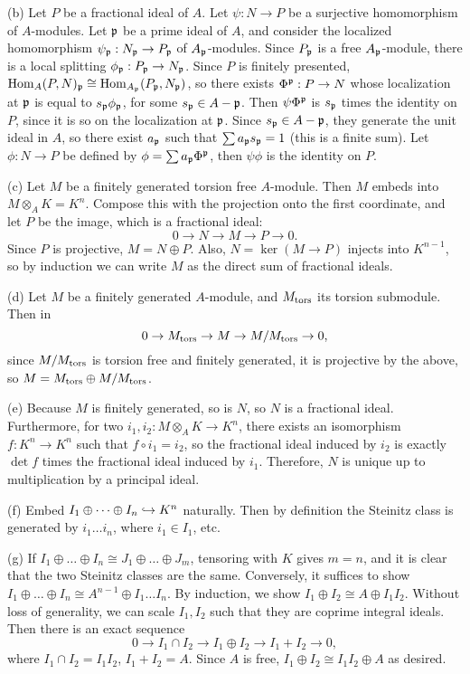 \documentclass[11pt]{amsart}
\begin{document}
(b) Let $P$ be a fractional ideal of $A$. Let $\psi: N\to P$ be a surjective homomorphism of $A$-modules. Let $\mathfrak{p}$ be a prime ideal of $A$, and consider the localized homomorphism $\psi_{\mathfrak{p}}: N_{\mathfrak{p}} \to P_{\mathfrak{p}}$ of $A_{\mathfrak{p}}$-modules. Since $P_{\mathfrak{p}}$ is a free $A_{\mathfrak{p}}$-module, there is a local splitting $\phi_{\mathfrak{p}}: P_{\mathfrak{p}} \to N_{\mathfrak{p}}$. Since $P$ is finitely presented, $\operatorname{Hom}_A(P, N)_{\mathfrak{p}} \cong \operatorname{Hom}_{A_{\mathfrak{p}}}(P_{\mathfrak{p}}, N_{\mathfrak{p}})$, so there exists $\Phi^{\mathfrak{p}}: P\to N$ whose localization at $\mathfrak{p}$ is equal to $s_{\mathfrak{p}}\phi_{\mathfrak{p}}$, for some $s_{\mathfrak{p}}\in A - \mathfrak{p}$. Then $\psi\Phi^{\mathfrak{p}}$ is $s_{\mathfrak{p}}$ times the identity on $P$, since it is so on the localization at $\mathfrak{p}$. Since $s_{\mathfrak{p}}\in A-\mathfrak{p}$, they generate the unit ideal in $A$, so there exist $a_{\mathfrak{p}}$ such that $\sum a_{\mathfrak{p}}s_{\mathfrak{p}} = 1$ (this is a finite sum). Let $\phi: N\to P$ be defined by $\phi = \sum a_{\mathfrak{p}} \Phi^{\mathfrak{p}}$, then $\psi\phi$ is the identity on $P$.

(c) Let $M$ be a finitely generated torsion free $A$-module. Then $M$ embeds into $M\otimes_A K = K^n$. Compose this with the projection onto the first coordinate, and let $P$ be the image, which is a fractional ideal:
\[0\to N\to M \to P \to 0.\]
Since $P$ is projective, $M = N\oplus P$. Also, $N = \ker(M\to P)$ injects into $K^{n-1}$, so by induction we can write $M$ as the direct sum of fractional ideals.

(d) Let $M$ be a finitely generated $A$-module, and $M_{\operatorname{tors}}$ its torsion submodule. Then in
\[0 \to M_{\operatorname{tors}} \to M \to M/M_{\operatorname{tors}} \to 0,\]
since $M/M_{\operatorname{tors}}$ is torsion free and finitely generated, it is projective by the above, so $M = M_{\operatorname{tors}}\oplus M/M_{\operatorname{tors}}$.

(e) Because $M$ is finitely generated, so is $N$, so $N$ is a fractional ideal. Furthermore, for two $i_1, i_2: M\otimes_A K \to K^n$, there exists an isomorphism $f: K^n \to K^n$ such that $f\circ i_1 = i_2$, so the fractional ideal induced by $i_2$ is exactly $\det f$ times the fractional ideal induced by $i_1$. Therefore, $N$ is unique up to multiplication by a principal ideal.

(f) Embed $I_1\oplus\dots \oplus I_n \hookrightarrow K^n$ naturally. Then by definition the Steinitz class is generated by $i_1\dots i_n$, where $i_1\in I_1$, etc.

(g) If $I_1\oplus\dots\oplus I_n \cong J_1\oplus\dots\oplus J_m$, tensoring with $K$ gives $m = n$, and it is clear that the two Steinitz classes are the same. Conversely, it suffices to show $I_1\oplus\dots \oplus I_n \cong A^{n-1}\oplus I_1\dots I_n$. By induction, we show $I_1 \oplus I_2 \cong A \oplus I_1I_2$. Without loss of generality, we can scale $I_1,I_2$ such that they are coprime integral ideals. Then there is an exact sequence
\[0 \to I_1\cap I_2 \to I_1\oplus I_2 \to I_1+I_2 \to 0,\]
where $I_1\cap I_2 = I_1I_2$, $I_1+I_2 = A$. Since $A$ is free, $I_1\oplus I_2 \cong I_1I_2\oplus A$ as desired.
\end{document}
